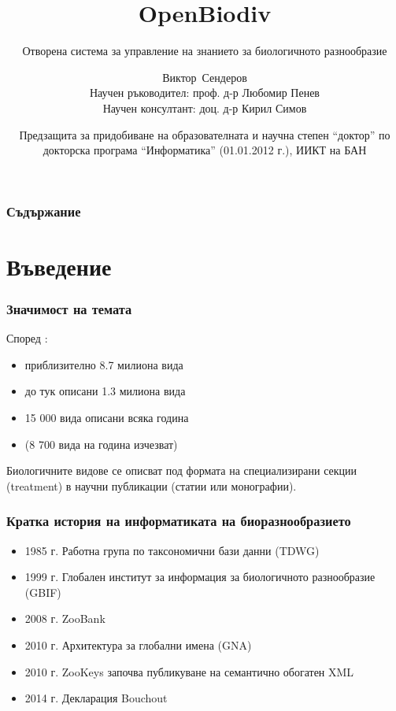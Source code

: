 \documentclass[bulgarian]{beamer}
\title[OpenBiodiv] %
{OpenBiodiv}
\subtitle{Отворена система за управление на знанието за биологичното разнообразие}
\author[Сендеров, Виктор] %
{Виктор~Сендеров\\{\tiny Научен ръководител: проф. д-р Любомир Пенев\inst{1}}\\{\tiny Научен консултант: доц. д-р Кирил Симов\inst{2}}}
\institute[] %
{
  \inst{1}%
  Академично издателство ``Пенсофт''\\
  \and
  \inst{2}%
  Институт по информационни и комуникационни технологии\\
  Бъгларска академия на науките
}
\date[18.12.2018] %
{Предзащита за придобиване на образователната и научна степен ``доктор'' по докторска програма ``Информатика'' (01.01.2012 г.), ИИКТ на БАН}
\begin{document}
\frame{\titlepage}


\begin{frame}
\frametitle{Съдържание}
\tableofcontents
\end{frame}


\section{Въведение}

\begin{frame}
\frametitle{Значимост на темата}
Според \cite{mora_how_2011}:
\begin{itemize}
    \item приблизително 8.7 милиона вида
    \item до тук описани 1.3 милиона вида
    \item 15 000 вида описани всяка година
    \item (8 700 вида на година изчезват)
\end{itemize}
 
\vspace{5mm}

Биологичните видове се описват под формата на специализирани секции (treatment) в научни публикации (статии или монографии).

\end{frame}

\begin{frame}
\frametitle{Кратка история на информатиката на биоразнообразието}

\begin{itemize}
    \item 1985 г. Работна група по таксономични бази данни (TDWG)
    \item 1999 г. Глобален институт за информация за биологичното разнообразие (GBIF)
    \item 2008 г. ZooBank
    \item 2010 г. Архитектура за глобални имена (GNA)
    \item 2010 г. ZooKeys започва публикуване на семантично обогатен XML
    \item 2014 г. Декларация Bouchout
\end{itemize}

\end{frame}
\end{document}
